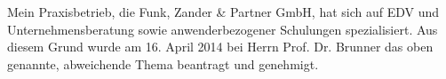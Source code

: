 Mein Praxisbetrieb, die Funk, Zander \& Partner GmbH, hat sich auf EDV und Unternehmensberatung sowie anwenderbezogener Schulungen spezialisiert. Aus diesem Grund wurde am 16. April 2014 bei Herrn Prof. Dr. Brunner das oben genannte, abweichende Thema beantragt und genehmigt.
